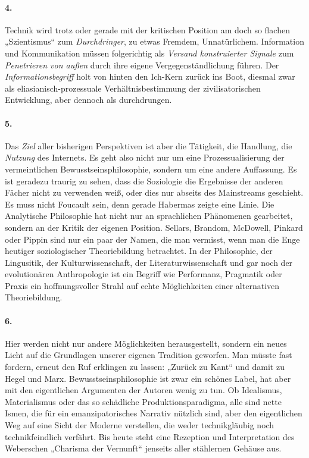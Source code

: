 \documentclass[12pt,a4paper]{article}
\begin{document}
\paragraph{4.} 
Technik wird trotz oder gerade mit der kritischen Position am doch so flachen
„Szientismus“ zum \emph{Durchdringer}, zu etwas Fremdem, Unnatürlichem.
Information und Kommunikation müssen folgerichtig als \emph{Versand
  konstruierter Signale} zum \emph{Penetrieren von außen} durch ihre eigene
Vergegenständlichung führen. Der \emph{Informationsbegriff} holt von hinten den
Ich-Kern zurück ins Boot, diesmal zwar als eliasianisch-prozessuale
Verhältnisbestimmung der zivilisatorischen Entwicklung, aber dennoch als
durchdrungen.

\paragraph{5.} 
Das \emph{Ziel} aller bisherigen Perspektiven ist aber die Tätigkeit, die
Handlung, die \emph{Nutzung} des Internets. Es geht also nicht nur um eine
Prozessualisierung der vermeintlichen Bewusstseinsphilosophie, sondern um eine
andere Auffassung. Es ist geradezu traurig zu sehen, dass die Soziologie die
Ergebnisse der anderen Fächer nicht zu verwenden weiß, oder dies nur abseits
des Mainstreams geschieht. Es muss nicht Foucault sein, denn gerade Habermas
zeigte eine Linie. Die Analytische Philosophie hat nicht nur an sprachlichen
Phänomenen gearbeitet, sondern an der Kritik der eigenen Position. Sellars,
Brandom, McDowell, Pinkard oder Pippin sind nur ein paar der Namen, die man
vermisst, wenn man die Enge heutiger soziologischer Theoriebildung betrachtet.
In der Philosophie, der Lingusitik, der Kulturwissenschaft, der
Literaturwissenschaft und gar noch der evolutionären Anthropologie ist ein
Begriff wie Performanz, Pragmatik oder Praxis ein hoffnungsvoller Strahl auf
echte Möglichkeiten einer alternativen Theoriebildung.

\paragraph{6.} 
Hier werden nicht nur andere Möglichkeiten herausgestellt, sondern ein neues
Licht auf die Grundlagen unserer eigenen Tradition geworfen. Man müsste fast
fordern, erneut den Ruf erklingen zu lassen: „Zurück zu Kant“ und damit zu
Hegel und Marx. Bewusstseinsphilosophie ist zwar ein schönes Label, hat aber
mit den eigentlichen Argumenten der Autoren wenig zu tun. Ob Idealismus,
Materialismus oder das so schädliche Produktionsparadigma, alle sind nette
Ismen, die für ein emanzipatorisches Narrativ nützlich sind, aber den
eigentlichen Weg auf eine Sicht der Moderne verstellen, die weder
technikgläubig noch technikfeindlich verfährt. Bis heute steht eine Rezeption
und Interpretation des Weberschen „Charisma der Vernunft“ jenseits aller
stählernen Gehäuse aus.
\medskip
\end{document}
